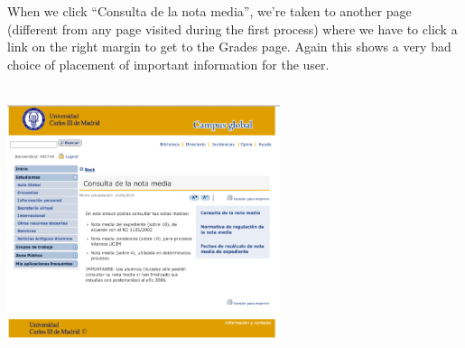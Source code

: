 \documentclass{article}
\begin{document}
When we click “Consulta de la nota media”, we’re taken to another page (different from any page visited during the first process) where we have to click a link on the right margin to get to the Grades page. Again this shows a very bad choice of placement of important information for the user.
\begin{center}
\includegraphics[width=8cm, height=8cm, keepaspectratio]{2}\vspace{0.3cm} \\
\end{center}

\newpage
\end{document}
